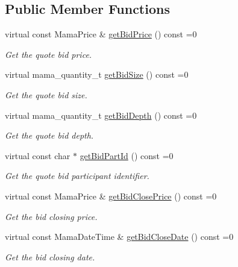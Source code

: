 \subsection*{Public Member Functions}
\begin{CompactItemize}
\item 
virtual const Mama\-Price \& \hyperlink{classWombat_1_1MamdaQuoteRecap_3ce7b05559823ceb1fa18a2f570164e3}{get\-Bid\-Price} () const =0
\begin{CompactList}\small\item\em Get the quote bid price. \item\end{CompactList}\item 
virtual mama\_\-quantity\_\-t \hyperlink{classWombat_1_1MamdaQuoteRecap_17c7f7da47862ebc9be5c1f51af674e0}{get\-Bid\-Size} () const =0
\begin{CompactList}\small\item\em Get the quote bid size. \item\end{CompactList}\item 
virtual mama\_\-quantity\_\-t \hyperlink{classWombat_1_1MamdaQuoteRecap_3e79b78c772dbba38ee9855e15557f9b}{get\-Bid\-Depth} () const =0
\begin{CompactList}\small\item\em Get the quote bid depth. \item\end{CompactList}\item 
virtual const char $\ast$ \hyperlink{classWombat_1_1MamdaQuoteRecap_0331215585ede823c609f4ddd164a902}{get\-Bid\-Part\-Id} () const =0
\begin{CompactList}\small\item\em Get the quote bid participant identifier. \item\end{CompactList}\item 
virtual const Mama\-Price \& \hyperlink{classWombat_1_1MamdaQuoteRecap_c3fc3c06bdaeed7bb72169c5a27c31b2}{get\-Bid\-Close\-Price} () const =0
\begin{CompactList}\small\item\em Get the bid closing price. \item\end{CompactList}\item 
virtual const Mama\-Date\-Time \& \hyperlink{classWombat_1_1MamdaQuoteRecap_fe853f4d35ca2a5c464110529c97c20f}{get\-Bid\-Close\-Date} () const =0
\begin{CompactList}\small\item\em Get the bid closing date. \item\end{CompactList}\item 

\end{CompactItemize}
